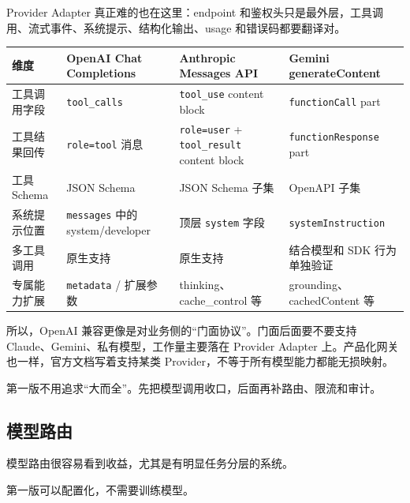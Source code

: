 \documentclass[9pt,a4paper,twocolumn]{ctexart}
\begin{document}
Provider Adapter 真正难的也在这里：endpoint 和鉴权头只是最外层，工具调用、流式事件、系统提示、结构化输出、usage 和错误码都要翻译对。


{\footnotesize
\begin{tabular}{|p{}|p{}|p{}|p{}|}
\hline
\textbf{维度} & \textbf{OpenAI Chat Completions} & \textbf{Anthropic Messages API} & \textbf{Gemini generateContent} \\
\hline
工具调用字段 & \texttt{tool\_calls} & \texttt{tool\_use} content block & \texttt{functionCall} part \\
\hline
工具结果回传 & \texttt{role=tool} 消息 & \texttt{role=user} + \texttt{tool\_result} content block & \texttt{functionResponse} part \\
\hline
工具 Schema & JSON Schema & JSON Schema 子集 & OpenAPI 子集 \\
\hline
系统提示位置 & \texttt{messages} 中的 system/developer & 顶层 \texttt{system} 字段 & \texttt{systemInstruction} \\
\hline
多工具调用 & 原生支持 & 原生支持 & 结合模型和 SDK 行为单独验证 \\
\hline
专属能力扩展 & \texttt{metadata} / 扩展参数 & thinking、cache\_control 等 & grounding、cachedContent 等 \\
\hline
\end{tabular}
}



所以，OpenAI 兼容更像是对业务侧的“门面协议”。门面后面要不要支持 Claude、Gemini、私有模型，工作量主要落在 Provider Adapter 上。产品化网关也一样，官方文档写着支持某类 Provider，不等于所有模型能力都能无损映射。



第一版不用追求“大而全”。先把模型调用收口，后面再补路由、限流和审计。



\subsection*{模型路由}


模型路由很容易看到收益，尤其是有明显任务分层的系统。



第一版可以配置化，不需要训练模型。
\end{document}
